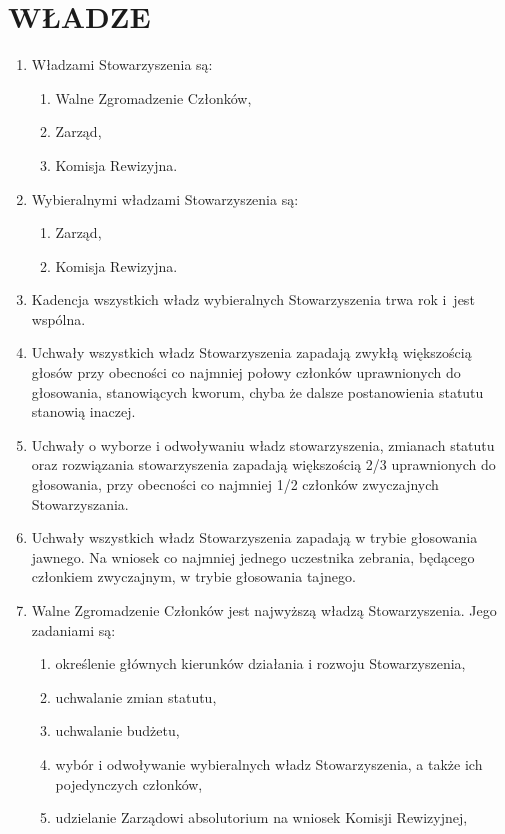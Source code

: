 \documentclass{article}
\begin{document}
\section{WŁADZE}
  \begin{enumerate}
    \item Władzami Stowarzyszenia są:
      \begin{enumerate}
        \item Walne Zgromadzenie Członków,
        \item Zarząd,
        \item Komisja Rewizyjna.
      \end{enumerate}
    \item Wybieralnymi władzami Stowarzyszenia są:
      \begin{enumerate}
        \item Zarząd,
        \item Komisja Rewizyjna.
      \end{enumerate}
    \item Kadencja wszystkich władz wybieralnych Stowarzyszenia trwa rok i~jest wspólna.
    \item Uchwały wszystkich władz Stowarzyszenia zapadają zwykłą większością głosów przy obecności co najmniej połowy członków uprawnionych do głosowania, stanowiących kworum, chyba że dalsze postanowienia statutu stanowią inaczej.
    \item Uchwały o wyborze i odwoływaniu władz stowarzyszenia, zmianach statutu oraz rozwiązania stowarzyszenia zapadają większością 2/3 uprawnionych do głosowania, przy obecności co najmniej 1/2 członków zwyczajnych Stowarzyszania.
    \item Uchwały wszystkich władz Stowarzyszenia zapadają w trybie głosowania jawnego. Na wniosek co najmniej jednego uczestnika zebrania, będącego członkiem zwyczajnym, w trybie głosowania tajnego.
    \item Walne Zgromadzenie Członków jest najwyższą władzą Stowarzyszenia. Jego zadaniami są:
      \begin{enumerate}
        \item określenie głównych kierunków działania i rozwoju Stowarzyszenia,
        \item uchwalanie zmian statutu,
        \item uchwalanie budżetu,
        \item wybór i odwoływanie wybieralnych władz Stowarzyszenia, a także ich pojedynczych członków,
        \item udzielanie Zarządowi absolutorium na wniosek Komisji Rewizyjnej,

\end{enumerate}
\end{enumerate}
\end{document}
